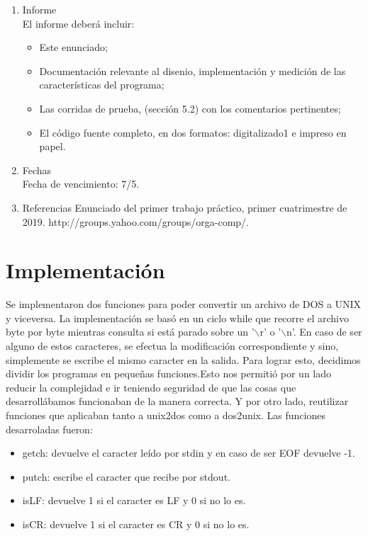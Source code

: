 \documentclass[a4paper,11pt]{article}
\begin{document}
\begin{enumerate}
\item Informe\\
El informe deber\'a incluir:
\begin{itemize}
\item Este enunciado;

\item Documentaci\'on relevante al disenio, implementaci\'on y medici\'on de las
caracter\'isticas del programa;

\item Las corridas de prueba, (secci\'on 5.2) con los comentarios pertinentes;

\item El c\'odigo fuente completo, en dos formatos: digitalizado1 e impreso en
papel. 
\end{itemize}

\item Fechas \\
Fecha de vencimiento: 7/5.

\item Referencias
Enunciado del primer trabajo pr\'actico, primer cuatrimestre de 2019.
http://groups.yahoo.com/groups/orga-comp/.

\end{enumerate}
\newpage

\section{Implementaci\'on}
Se implementaron dos funciones para poder convertir un archivo de DOS a UNIX y viceversa. La implementaci\'on se basó en un ciclo while que recorre el archivo byte por byte mientras consulta si está parado sobre un '$\backslash$r' o '$\backslash$n'. En caso de ser alguno de estos caracteres, se efectua la modificación correspondiente y sino, simplemente se escribe el mismo caracter en la salida.
Para lograr esto, decidimos dividir los programas en pequeñas funciones.Esto nos permiti\'o por un lado reducir la complejidad e ir teniendo seguridad de que las cosas que desarroll\'abamos funcionaban de la manera correcta. Y por otro lado, reutilizar funciones que aplicaban tanto a unix2dos como a dos2unix. Las funciones desarroladas fueron:

\begin{itemize}
\item getch: devuelve el caracter le\'ido por stdin y en caso de ser EOF devuelve -1.

\item putch: escribe el caracter que recibe por stdout.

\item isLF: devuelve 1 si el caracter es LF y 0 si no lo es.

\item isCR: devuelve 1 si el caracter es CR y 0 si no lo es.
\end{itemize}
\end{document}

